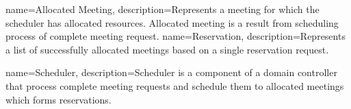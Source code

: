 {
  name=Allocated Meeting,
  description={Represents a meeting for which the scheduler has allocated resources. 
    Allocated meeting is a result from scheduling process of complete meeting 
    request.}
}
{
  name=Reservation,
  description={Represents a list of successfully allocated meetings based on a single
    reservation request.}
}

%
%
{
  name=Scheduler,
  description={Scheduler is a component of a domain controller that process complete 
    meeting requests and schedule them to allocated meetings which forms reservations.}
}
